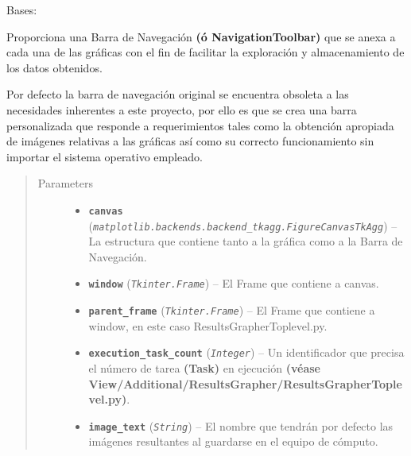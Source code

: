 \documentclass[letterpaper,10pt,english]{sphinxmanual}
\begin{document}
\begin{fulllineitems}
\label{View/Additional/ResultsGrapher/CustomNavigationToolbar2TkAgg:View.Additional.ResultsGrapher.CustomNavigationToolbar2TkAgg.CustomNavigationToolbar2TkAgg}
Bases: 

\begin{DUlineblock}{0em}
\item[] Proporciona una Barra de Navegación \textbf{(ó NavigationToolbar)} que se anexa a cada
una de las gráficas con el fin de facilitar la exploración y almacenamiento de los
datos obtenidos.
\item[] Por defecto la barra de navegación original se encuentra obsoleta a las necesidades
inherentes a este proyecto, por ello es que se crea una barra personalizada que
responde a requerimientos tales como la obtención apropiada de imágenes relativas
a las gráficas así como su correcto funcionamiento sin importar el sistema operativo
empleado.
\end{DUlineblock}
\begin{quote}\begin{description}
\item[{Parameters}] \leavevmode\begin{itemize}
\item {} 
\textbf{\texttt{canvas}} (\emph{\texttt{matplotlib.backends.backend\_tkagg.FigureCanvasTkAgg}}) -- La estructura que contiene tanto a la gráfica como a la Barra de Navegación.

\item {} 
\textbf{\texttt{window}} (\emph{\texttt{Tkinter.Frame}}) -- El Frame que contiene a canvas.

\item {} 
\textbf{\texttt{parent\_frame}} (\emph{\texttt{Tkinter.Frame}}) -- El Frame que contiene a window, en este caso ResultsGrapherToplevel.py.

\item {} 
\textbf{\texttt{execution\_task\_count}} (\emph{\texttt{Integer}}) -- Un identificador que precisa el número de tarea \textbf{(Task)} en ejecución
\textbf{(véase View/Additional/ResultsGrapher/ResultsGrapherToplevel.py)}.

\item {} 
\textbf{\texttt{image\_text}} (\emph{\texttt{String}}) -- El nombre que tendrán por defecto las imágenes resultantes al guardarse en el equipo
de cómputo.


\end{itemize}
\end{description}
\end{quote}
\end{fulllineitems}
\end{document}
